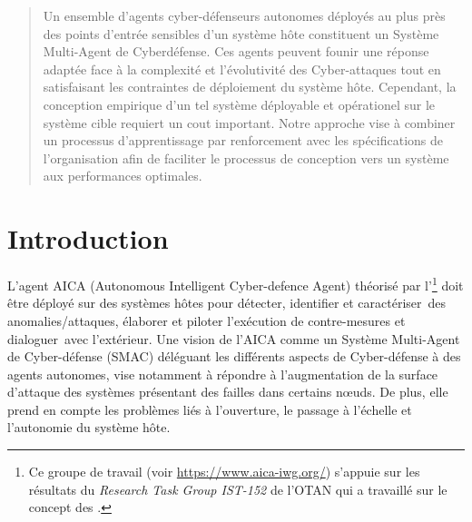 \documentclass[conference]{IEEEtran}
\begin{document}
\maketitle

\begin{abstract}

Un ensemble d'agents cyber-défenseurs autonomes déployés au plus près des points d'entrée sensibles d'un système hôte constituent un Système Multi-Agent de Cyberdéfense. Ces agents peuvent founir une réponse adaptée face à la complexité et l'évolutivité des Cyber-attaques tout en satisfaisant les contraintes de déploiement du système hôte.
Cependant, la conception empirique d'un tel système déployable et opérationel sur le système cible requiert un cout important.
Notre approche vise à combiner un processus d'apprentissage par renforcement avec les spécifications de l'organisation afin de faciliter le processus de conception vers un système aux performances optimales.

\end{abstract}


\section{Introduction}


L'agent AICA (Autonomous Intelligent Cyber-defence Agent) théorisé par l'\footnote{Ce groupe de travail (voir \url{https://www.aica-iwg.org/}) s'appuie sur les résultats du \textit{Research Task Group IST-152} de l'OTAN qui a travaillé sur le concept des .} doit être déployé sur des systèmes hôtes pour détecter, identifier et caractériser des anomalies/attaques, élaborer et piloter l’exécution de contre-mesures et dialoguer avec l'extérieur.
Une vision de l'AICA comme un Système Multi-Agent de Cyber-défense (SMAC) déléguant les différents aspects de Cyber-défense à des agents autonomes, vise notamment à répondre à l'augmentation de la surface d'attaque des systèmes  présentant des failles dans certains nœuds\cite{kott2018autonomous}. De plus, elle prend en compte les problèmes liés à l'ouverture, le passage à l'échelle et l'autonomie du système hôte.
\end{document}
